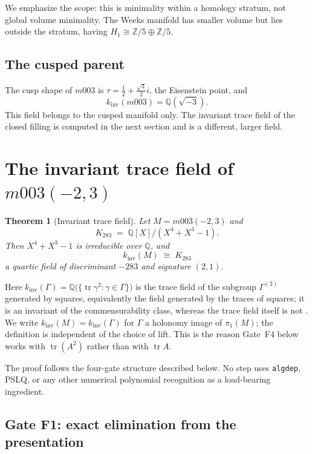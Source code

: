 \documentclass[11pt,a4paper]{article}
\newtheorem{theorem}{Theorem}[section]
\theoremstyle{definition}
\theoremstyle{remark}
\newcommand{\tr}{\operatorname{tr}}
\newcommand{\kinv}{k_{\mathrm{inv}}}
\newcommand{\Zfive}{\mathbb{Z}/5}
\newcommand{\Q}{\mathbb{Q}}
\begin{document}
We emphasize the scope: this is minimality within a homology stratum,
not global volume minimality. The Weeks manifold has smaller volume
but lies outside the stratum, having $H_1 \cong \Zfive \oplus \Zfive$.

\subsection{The cusped parent}

The cusp shape of $m003$ is $\tau = \tfrac12 + \tfrac{\sqrt3}{2} i$,
the Eisenstein point, and
\begin{equation}
\kinv(m003) = \Q(\sqrt{-3}).
\end{equation}
This field belongs to the cusped manifold only. The invariant trace
field of the closed filling is computed in the next section and is
a different, larger field.

\section{The invariant trace field of $m003(-2,3)$}
\label{sec:itf}

\begin{theorem}[Invariant trace field]
\label{thm:itf}
Let $M = m003(-2,3)$ and
\begin{equation}
K_{283} \;=\; \Q[X]/(X^4+X^3-1).
\end{equation}
Then $X^4+X^3-1$ is irreducible over $\Q$, and
\begin{equation}
\boxed{\;\kinv(M) \;\cong\; K_{283}\;}
\end{equation}
a quartic field of discriminant $-283$ and signature $(2,1)$.
\end{theorem}

Here $\kinv(\Gamma) = \Q\bigl(\{\tr\gamma^2 : \gamma \in \Gamma\}\bigr)$
is the trace field of the subgroup $\Gamma^{(2)}$ generated by squares,
equivalently the field generated by the traces of squares; it is an
invariant of the commensurability class, whereas the trace field itself
is not \cite[Ch.~3]{MR}. We write $\kinv(M) = \kinv(\Gamma)$ for
$\Gamma$ a holonomy image of $\pi_1(M)$; the definition is independent
of the choice of lift. This is the reason Gate~F4 below works with
$\tr(A^2)$ rather than with $\tr A$.

The proof follows the four-gate structure described below. No step
uses \texttt{algdep}, PSLQ, or any other numerical polynomial
recognition as a load-bearing ingredient.

\subsection{Gate F1: exact elimination from the presentation}
\end{document}
